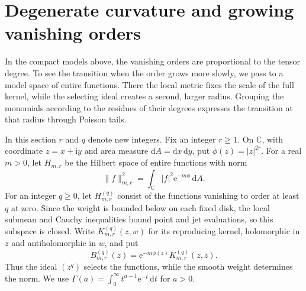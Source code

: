 \section{Degenerate curvature and growing vanishing orders}
\label{sec:degenerate-selected-kernels}

In the compact models above, the vanishing orders are proportional to the tensor degree. To see the transition when the order grows more slowly, we pass to a model space of entire functions. There the local metric fixes the scale of the full kernel, while the selecting ideal creates a second, larger radius. Grouping the monomials according to the residues of their degrees expresses the transition at that radius through Poisson tails.

In this section $r$ and $q$ denote new integers. Fix an integer $r\geq1$. On $\mathbb C$, with coordinate $z=x+\mathrm{i}y$ and area measure $\mathrm{d}A=\mathrm{d}x\,\mathrm{d}y$, put $\phi(z)=|z|^{2r}$. For a real $m>0$, let $H_{m,r}$ be the Hilbert space of entire functions with norm
\[
 \|f\|_{m,r}^2=\int_{\mathbb C}|f|^2\mathrm{e}^{-m\phi}\,\mathrm{d}A.
\]
For an integer $q\geq0$, let $H_{m,r}^{(q)}$ consist of the functions vanishing to order at least $q$ at zero. Since the weight is bounded below on each fixed disk, the local submean and Cauchy inequalities bound point and jet evaluations, so this subspace is closed. Write $K_{m,r}^{(q)}(z,w)$ for its reproducing kernel, holomorphic in $z$ and antiholomorphic in $w$, and put
\[
 B_{m,r}^{(q)}(z)=\mathrm{e}^{-m\phi(z)}K_{m,r}^{(q)}(z,z).
\]
Thus the ideal $(z^q)$ selects the functions, while the smooth weight determines the norm. We use $\Gamma(a)=\int_0^\infty t^{a-1}\mathrm{e}^{-t}\,\mathrm{d}t$ for $a>0$.

